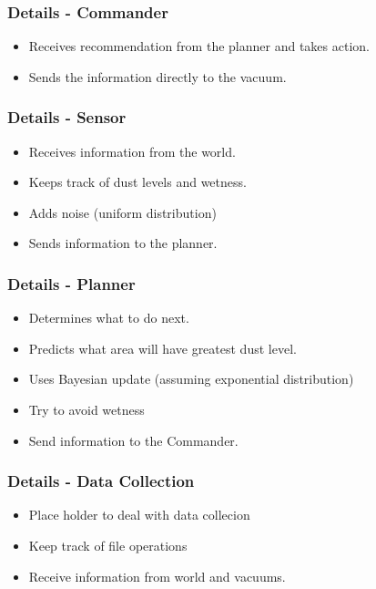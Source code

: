 \documentclass{beamer}
\begin{document}
\begin{frame}
  \frametitle{Details - Commander}

  \begin{itemize}
  \item Receives recommendation from the planner and takes action.
  \item Sends the information directly to the vacuum.
  \end{itemize}

\end{frame}


\begin{frame}
  \frametitle{Details - Sensor}
  
  \begin{itemize}
  \item Receives information from the world.
  \item Keeps track of dust levels and wetness.
  \item Adds noise (uniform distribution)
  \item Sends information to the planner.
  \end{itemize}

\end{frame}


\begin{frame}
  \frametitle{Details - Planner}

  \begin{itemize}
  \item Determines what to do next.
  \item Predicts what area will have greatest dust level.
  \item Uses Bayesian update (assuming exponential distribution)
  \item Try to avoid wetness
  \item Send information to the Commander.
  \end{itemize}
  
\end{frame}


\begin{frame}
  \frametitle{Details - Data Collection}

  \begin{itemize}
  \item Place holder to deal with data collecion
  \item Keep track of file operations
  \item Receive information from  world and vacuums.
  \end{itemize}

\end{frame}
\end{document}
